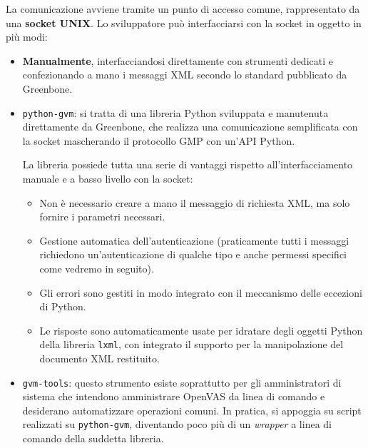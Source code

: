 La comunicazione avviene tramite un punto di accesso comune, rappresentato da una \textbf{socket UNIX}. Lo sviluppatore può interfacciarsi con la socket in oggetto in più modi:
\begin{itemize}
    \item \textbf{Manualmente}, interfacciandosi direttamente con strumenti dedicati e confezionando a mano i messaggi XML secondo lo standard pubblicato da Greenbone.
    \item \texttt{python-gvm}: si tratta di una libreria Python sviluppata e manutenuta direttamente da Greenbone, che realizza una comunicazione semplificata con la socket mascherando il protocollo GMP con un'API Python.
    
    La libreria possiede tutta una serie di vantaggi rispetto all'interfacciamento manuale e a basso livello con la socket:
    \begin{itemize}
        \item Non è necessario creare a mano il messaggio di richiesta XML, ma solo fornire i parametri necessari.
        \item Gestione automatica dell'autenticazione (praticamente tutti i messaggi richiedono un'autenticazione di qualche tipo e anche permessi specifici come vedremo in seguito).
        \item Gli errori sono gestiti in modo integrato con il meccanismo delle eccezioni di Python.
        \item Le risposte sono automaticamente usate per idratare degli oggetti Python della libreria \texttt{lxml}, con integrato il supporto per la manipolazione del documento XML restituito.
    \end{itemize}
    \item \texttt{gvm-tools}: questo strumento esiste soprattutto per gli amministratori di sistema che intendono amministrare OpenVAS da linea di comando e desiderano automatizzare operazioni comuni. In pratica, si appoggia su script realizzati su \texttt{python-gvm}, diventando poco più di un \emph{wrapper} a linea di comando della suddetta libreria.
\end{itemize}

